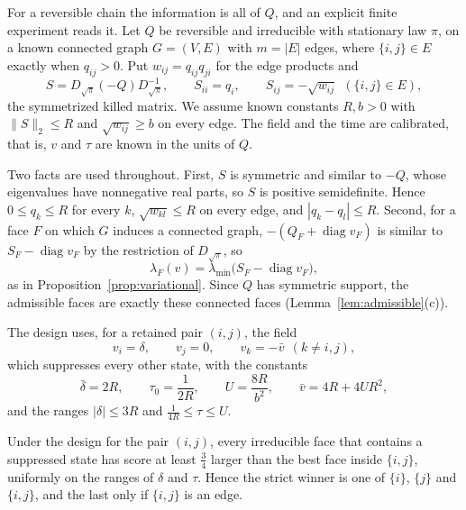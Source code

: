 For a reversible chain the information is all of $Q$, and an explicit finite
experiment reads it. Let $Q$ be reversible and irreducible with stationary law
$\pi$, on a known connected graph $G=(V,E)$ with $m=|E|$ edges, where
$\{i,j\}\in E$ exactly when $q_{ij}>0$. Put $w_{ij}=q_{ij}q_{ji}$ for the edge
products and
\[
 S=D_{\sqrt\pi}(-Q)D_{\sqrt\pi}^{-1},\qquad S_{ii}=q_i,\qquad S_{ij}=-\sqrt{w_{ij}}\ \ (\{i,j\}\in E),
\]
the symmetrized killed matrix. We assume known constants $R,b>0$ with
$\|S\|_2\le R$ and $\sqrt{w_{ij}}\ge b$ on every edge. The field and the time
are calibrated, that is, $v$ and $\tau$ are known in the units of $Q$.

Two facts are used throughout. First, $S$ is symmetric and similar to $-Q$,
whose eigenvalues have nonnegative real parts, so $S$ is positive
semidefinite. Hence $0\le q_k\le R$ for every $k$, $\sqrt{w_{kl}}\le R$ on every
edge, and $|q_k-q_l|\le R$. Second, for a face $F$ on which $G$ induces a
connected graph, $-(Q_F+\operatorname{diag}v_F)$ is similar to
$S_F-\operatorname{diag}v_F$ by the restriction of $D_{\sqrt\pi}$, so
\begin{equation}\label{eq:lambda-sym}
 \lambda_F(v)=\lambda_{\min}\bigl(S_F-\operatorname{diag}v_F\bigr),
\end{equation}
as in Proposition~\ref{prop:variational}. Since $Q$ has symmetric support, the
admissible faces are exactly these connected faces
(Lemma~\ref{lem:admissible}(c)).

The design uses, for a retained pair $(i,j)$, the field
\[
 v_i=\delta,\qquad v_j=0,\qquad v_k=-\bar v\ \ (k\ne i,j),
\]
which suppresses every other state, with the constants
\[
 \bar\delta=2R,\qquad \tau_0=\frac1{2R},\qquad U=\frac{8R}{b^2},\qquad \bar v=4R+4UR^2,
\]
and the ranges $|\delta|\le3R$ and $\frac1{4R}\le\tau\le U$.

\begin{lemma}[suppression]\label{lem:suppression}
Under the design for the pair $(i,j)$, every irreducible face that contains a
suppressed state has score at least $\frac34$ larger than the best face inside
$\{i,j\}$, uniformly on the ranges of $\delta$ and $\tau$. Hence the strict
winner is one of $\{i\}$, $\{j\}$ and $\{i,j\}$, and the last only if
$\{i,j\}$ is an edge.
\end{lemma}

